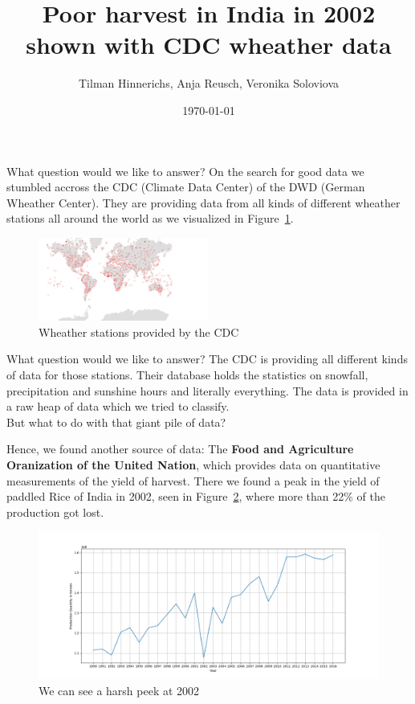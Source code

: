 \documentclass[10pt]{beamer}
\title{Poor harvest in India in 2002 shown with CDC wheather data}
\author{Tilman Hinnerichs, Anja Reusch, Veronika Soloviova}
\institute{Bertelsmann Data Science Scholarship Program}
\date{\today}
\begin{document}
\begin{frame}
	\titlepage
\end{frame}

\begin{frame}{What question would we like to answer?}
	On the search for good data we stumbled accross the CDC (Climate Data Center) of the DWD (German Wheather Center). They are providing data from all kinds of different wheather stations all around the world as we visualized in Figure~\ref{Stations}.
	\begin{figure}[ht]
		\centering
		\includegraphics[width = 0.5\textwidth]{WheatherStations.jpeg}
		\caption{Wheather stations provided by the CDC}
		\label{Stations}
	\end{figure}
\end{frame}	

\begin{frame}{What question would we like to answer?}
	The CDC is providing all different kinds of data for those stations. Their database holds the statistics on snowfall, precipitation and sunshine hours and literally everything. The data is provided in a raw heap of data which we tried to classify.\\\vfill
	\large But what to do with that giant pile of data?
\end{frame}

\begin{frame}
	Hence, we found another source of data: The \textbf{Food and Agriculture Oranization of the United Nation}, which provides data on quantitative measurements of the yield of harvest. There we found a peak in the yield of paddled Rice of India in 2002, seen in Figure~\ref{IndiaRice}, where more than 22\% of the production got lost.
	\begin{figure}
		\includegraphics[width=1\textwidth]{IndiaRiceQuantity.png}
		\caption{We can see a harsh peek at 2002}
		\label{IndiaRice}
	\end{figure}
\end{frame}
\end{document}

